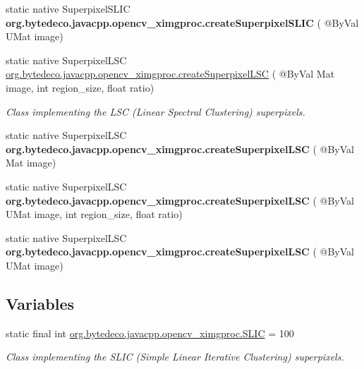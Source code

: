 \begin{DoxyCompactItemize}
static native Superpixel\+S\+L\+IC {\bfseries org.\+bytedeco.\+javacpp.\+opencv\+\_\+ximgproc.\+create\+Superpixel\+S\+L\+IC} ( @By\+Val U\+Mat image)
\item 
static native Superpixel\+L\+SC \hyperlink{group__ximgproc__superpixel_ga8bf6750a423a7f806993324e9b1a2276}{org.\+bytedeco.\+javacpp.\+opencv\+\_\+ximgproc.\+create\+Superpixel\+L\+SC} ( @By\+Val Mat image, int region\+\_\+size, float ratio)
\begin{DoxyCompactList}\small\item\em Class implementing the L\+SC (Linear Spectral Clustering) superpixels. \end{DoxyCompactList}\item 
\mbox{\label{group__ximgproc__superpixel_ga6e95daf111854a1c9815418c1f457c6f}} 
static native Superpixel\+L\+SC {\bfseries org.\+bytedeco.\+javacpp.\+opencv\+\_\+ximgproc.\+create\+Superpixel\+L\+SC} ( @By\+Val Mat image)
\item 
\mbox{\label{group__ximgproc__superpixel_ga6725dc25b2729f2588d51d6a424af122}} 
static native Superpixel\+L\+SC {\bfseries org.\+bytedeco.\+javacpp.\+opencv\+\_\+ximgproc.\+create\+Superpixel\+L\+SC} ( @By\+Val U\+Mat image, int region\+\_\+size, float ratio)
\item 
\mbox{\label{group__ximgproc__superpixel_ga6d60a343281c3d9676cd8367f5b3a33d}} 
static native Superpixel\+L\+SC {\bfseries org.\+bytedeco.\+javacpp.\+opencv\+\_\+ximgproc.\+create\+Superpixel\+L\+SC} ( @By\+Val U\+Mat image)
\end{DoxyCompactItemize}
\subsection*{Variables}
\begin{DoxyCompactItemize}
\item 
static final int \hyperlink{group__ximgproc__superpixel_gad6647d487c2dfbf08f2a26f408f020c3}{org.\+bytedeco.\+javacpp.\+opencv\+\_\+ximgproc.\+S\+L\+IC} = 100
\begin{DoxyCompactList}\small\item\em Class implementing the S\+L\+IC (Simple Linear Iterative Clustering) superpixels. \end{DoxyCompactList}\end{DoxyCompactItemize}



